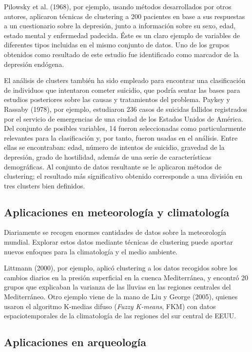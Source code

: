 Pilowsky et al. (1968), por ejemplo, usando métodos desarrollados por otros autores, aplicaron técnicas de clustering a 200 pacientes en base a sus respuestas a un cuestionario sobre la depresión, junto a información sobre su sexo, edad, estado mental y enfermedad padecida. Éste es un claro ejemplo de variables de diferentes tipos incluidas en el mismo conjunto de datos. Uno de los grupos obtenidos como resultado de este estudio fue identificado como marcador de la depresión endógena.

El análisis de clusters también ha sido empleado para encontrar una clasificación de individuos que intentaron cometer suicidio, que podría sentar las bases para estudios posteriores sobre las causas y tratamientos del problema. Paykey y Rassaby (1978), por ejemplo, estudiaron 236 casos de suicidas fallidos registrados por el servicio de emergencias de una ciudad de los Estados Unidos de América. Del conjunto de posibles variables, 14 fueron seleccionadas como particularmente relevantes para la clasificación y, por tanto, fueron usadas en el análisis. Entre ellas se encontraban: edad, número de intentos de suicidio, gravedad de la depresión, grado de hostilidad, además de una serie de características demográficas. Al conjunto de datos resultante se le aplicaron métodos de clustering; el resultado más significativo obtenido corresponde a una división en tres clusters bien definidos.

\subsection{Aplicaciones en meteorología y climatología}

Diariamente se recogen enormes cantidades de datos sobre la meteorología mundial. Explorar estos datos mediante técnicas de clustering puede aportar nuevos enfoques para la climatología y el medio ambiente.

Littmann (2000), por ejemplo, aplicó clustering a los datos recogidos sobre los cambios diarios en la presión superficial en la cuenca Mediterránea, y encontró 20 grupos que explicaban la varianza de las lluvias en las regiones centrales del Mediterráneo. Otro ejemplo viene de la mano de Liu y George (2005), quienes usaron el algoritmo K-medias difuso (\textit{Fuzzy K-means}, \acs{FKM}) con datos espaciotemporales de la climatología de las regiones del sur central de EEUU. 

\subsection{Aplicaciones en arqueología}

